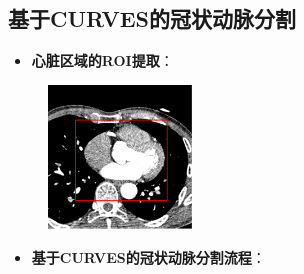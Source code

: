 \subsection[冠状动脉分割I]{基于CURVES的冠状动脉分割}

\begin{frame}
\begin{itemize}
  \item \textbf{心脏区域的ROI提取}：
\end{itemize}
\begin{figure}[t]
\centering
\includegraphics[width=1.5in]{../../Figures/coronary/ROI_Extraction}
\end{figure}
\end{frame}

\begin{frame}
\begin{itemize}
  \item \textbf{基于CURVES的冠状动脉分割流程}：
\end{itemize}
\begin{figure}[t]
\centering

\end{figure}
\end{frame}

